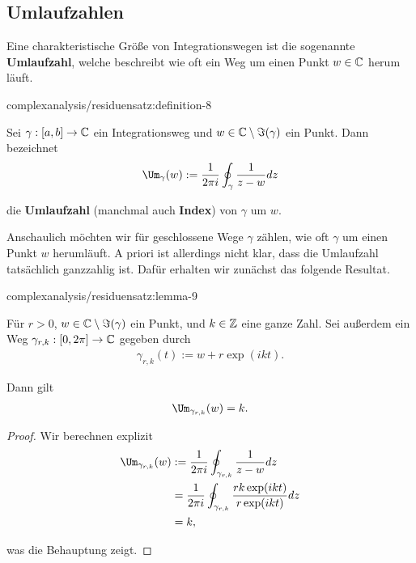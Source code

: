 \subsection{Umlaufzahlen}
\label{\detokenize{complexanalysis/residuensatz:umlaufzahlen}}
\par
Eine charakteristische Größe von Integrationswegen ist die sogenannte \textbf{Umlaufzahl}, welche beschreibt wie oft ein Weg um einen Punkt \(w\in\mathbb{C}\) herum läuft.
\begin{definition}{}{complexanalysis/residuensatz:definition-8}



\par
Sei \(\gamma:[a,b]\to\mathbb{C}\) ein Integrationsweg und \(w \in \mathbb{C} \setminus \Im(\gamma)\) ein Punkt.
Dann bezeichnet
\begin{align*}
\Um_\gamma(w) := 
\frac{1}{2\pi i} \oint_\gamma \frac{1}{z - w} dz
\end{align*}
\par
die \textbf{Umlaufzahl} (manchmal auch \textbf{Index}) von \(\gamma\) um \(w\).
\end{definition}

\par
Anschaulich möchten wir für geschlossene Wege \(\gamma\) zählen, wie oft \(\gamma\) um einen Punkt \(w\) herumläuft.
A priori ist allerdings nicht klar, dass die Umlaufzahl tatsächlich ganzzahlig ist.
Dafür erhalten wir zunächst das folgende Resultat.
\begin{lemma}{}{complexanalysis/residuensatz:lemma-9}



\par
Für \(r>0\), \(w\in\mathbb{C} \setminus \Im(\gamma)\) ein Punkt, und \(k\in\mathbb{Z}\) eine ganze Zahl.
Sei außerdem ein Weg \(\gamma_{r,k}:[0,2\pi]\to\mathbb{C}\) gegeben durch
\begin{align*}
\gamma_{r,k}(t) := w + r \exp(ikt).
\end{align*}
\par
Dann gilt
\begin{align*}
\Um_{\gamma_{r,k}}(w) = k.
\end{align*}\end{lemma}

\begin{proof}
 Wir berechnen explizit
\begin{align*}
\Um_{\gamma_{r,k}}(w) &:= 
\frac{1}{2\pi i} \oint_{\gamma_{r,k}} \frac{1}{z - w} dz\\ 
&=
\frac{1}{2\pi i} \oint_{\gamma_{r,k}} \frac{r k \exp(ikt)}{r \exp(ikt)} dz\\
&= k,
\end{align*}
\par
was die Behauptung zeigt.
\end{proof}

